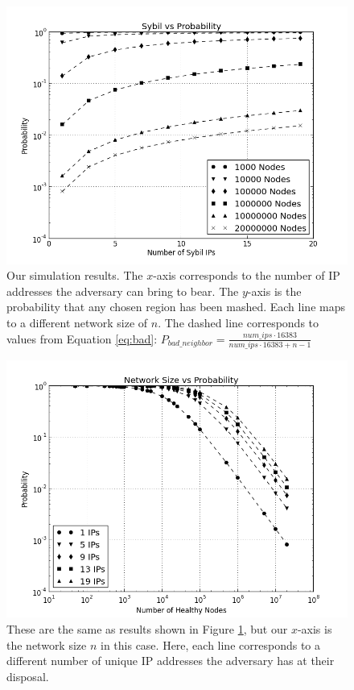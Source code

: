 \documentclass[11pt,conference]{IEEEtran}
\begin{document}
\begin{figure}
\centering
\includegraphics[width=1\linewidth]{ip_prob_all}
\caption[foo]{Our simulation results.  
    The $x$-axis corresponds to the number of IP addresses the adversary can bring to bear.
    The $y$-axis is the probability that any chosen region has been mashed.
    Each line maps to a different network size of $n$.
    The dashed line corresponds to values from Equation \ref{eq:bad}: $ P_{bad\_neighbor} =  \frac{num\_ips \cdot 16383}{num\_ips \cdot 16383 + n - 1}$}
\label{fig:exp2}
\end{figure}


\begin{figure}
\centering
\includegraphics[width=\linewidth]{size_prob_all}
\caption[a]{These are the same as results shown in Figure \ref{fig:exp2}, but our $x$-axis is the network size $n$ in this case.  
    Here, each line corresponds to a different number of unique IP addresses the adversary has at their disposal.}
\label{fig:size_prob_all}
\end{figure}
\end{document}
